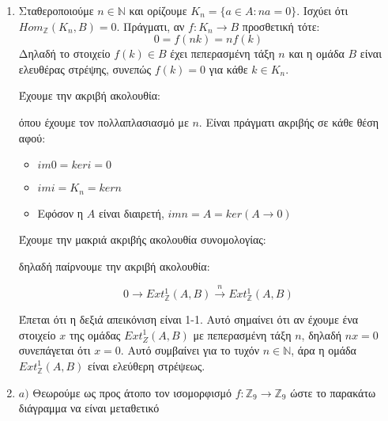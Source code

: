 \documentclass{article}
\newcommand{\Z}{\mathbb{Z}}
\begin{document}
\begin{enumerate}
	\item Σταθεροποιούμε $n \in \mathbb{N}$ και ορίζουμε $K_n = \{ a \in A : na=0\}$. Ισχύει ότι $Hom_{\Z} (K_n , B) = 0$. Πράγματι, αν $f: K_n \rightarrow B$ προσθετική τότε:
		$$0 = f(nk) = nf(k)$$
		Δηλαδή το στοιχείο $f(k) \in B$ έχει πεπερασμένη τάξη $n$ και η ομάδα $B$ είναι ελευθέρας στρέψης, συνεπώς $f(k) = 0$ για κάθε $k \in K_n$.

		Έχουμε την ακριβή ακολουθία:

		\begin{center}
		\end{center}

		όπου έχουμε τον πολλαπλασιασμό με $n$. Είναι πράγματι ακριβής σε κάθε θέση αφού:

		\begin{itemize}
			\item $im 0 = keri = 0$
			\item $imi = K_n = kern$
			\item Εφόσον η $A$ είναι διαιρετή, $imn = A = ker(A\rightarrow 0)$
		\end{itemize}

		Έχουμε την μακριά ακριβής ακολουθία συνομολογίας:

		\begin{center}
		\end{center}

		δηλαδή παίρνουμε την ακριβή ακολουθία:

		$$0 \rightarrow Ext_{\Z}^1 (A,B) \xrightarrow{n} Ext_{\Z}^1 (A,B)$$

		Έπεται ότι η δεξιά απεικόνιση είναι 1-1. Αυτό σημαίνει ότι αν έχουμε ένα στοιχείο $x$ της ομάδας $Ext_{Z}^1 (A,B)$ με πεπερασμένη τάξη $n$, δηλαδή $nx=0$ συνεπάγεται ότι $x=0$. Αυτό συμβαίνει για το τυχόν $n \in \mathbb{N}$, άρα η ομάδα $Ext_{\Z}^1 (A,B)$ είναι ελεύθερη στρέψεως.
$ $\newline

\item $a)$ Θεωρούμε ως προς άτοπο τον ισομορφισμό $f: \Z_9 \rightarrow \Z_9$ ώστε το παρακάτω διάγραμμα να είναι μεταθετικό


\end{enumerate}
\end{document}
